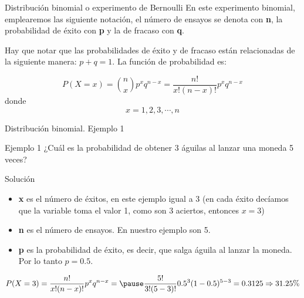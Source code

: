 \documentclass[11pt]{beamer}
\begin{document}
          \begin{frame}{Distribución binomial o experimento de Bernoulli}
              En este  experimento binomial, emplearemos las siguiente notación, el número de ensayos se denota con \textbf{n}, la probabilidad de éxito con \textbf{p} y la de fracaso con \textbf{q}.

              Hay que notar que las probabilidades de éxito y de fracaso están relacionadas de la siguiente manera: $p + q = 1.$
              La función de probabilidad es:

              $$P(X=x)=\binom{n}{x}p^xq^{n-x}=\dfrac{n!}{x!(n-x)!}p^xq^{n-x}$$
              donde
              $$x=1, 2, 3, \cdots ,n $$
          \end{frame}
          \begin{frame}{Distribución binomial. Ejemplo 1}

              \begin{block}{Ejemplo 1}
                 ¿Cuál es la probabilidad de obtener 3 águilas al lanzar una moneda 5 veces?
              \end{block}
              \begin{block}{Solución}
                 \begin{itemize}
                     \item \textbf{x} \pause es el número de éxitos, en este ejemplo igual a 3 (en cada éxito decíamos que la variable toma el valor 1, como son 3 aciertos, entonces $x = 3$)
                     \item \textbf{n} \pause es el número de ensayos. En nuestro ejemplo son 5.
                     \item \textbf{p} \pause es la probabilidad de éxito, es decir, que salga águila al lanzar la moneda. Por lo tanto $p = 0.5$.
                 \end{itemize}
                 \pause
                 $$P(X=3)=\dfrac{n!}{x!(n-x)!}p^xq^{n-x}= \pause \dfrac{5!}{3!(5-3)!}0.5^3(1-0.5)^{5-3}=0.3125\Rightarrow31.25\%$$
              \end{block}
          \end{frame}
\end{document}
